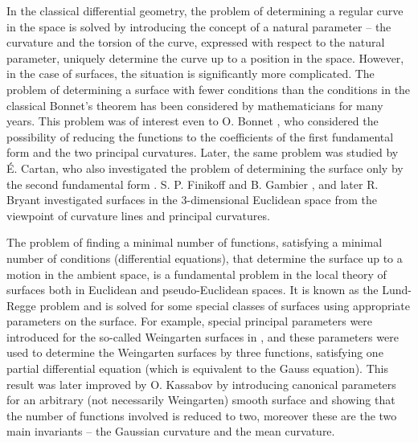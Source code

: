 \documentclass[12pt]{amsart}
\theoremstyle{definition}
\theoremstyle{remark}
\numberwithin{equation}{section}
\begin{document}
In the classical differential geometry, the problem of determining a regular curve in the space is solved by introducing the concept of a natural parameter -- the curvature and the torsion of the curve, expressed with respect to the natural parameter, uniquely determine the curve up to a position in the space. However, in the case of surfaces,  the situation is significantly more complicated. The problem of determining a surface with fewer conditions than the conditions in the classical Bonnet’s theorem has been considered by mathematicians for many years. This problem was of interest even to O. Bonnet \cite{Bon}, who considered the possibility of reducing the functions to the coefficients of the first fundamental form and the two principal curvatures. Later, the same problem was studied by \'E. Cartan, who also investigated the problem of determining the surface only by the second fundamental form \cite{Cartan-1}. S. P. Finikoff and B. Gambier \cite{Fin-Gam}, and later R. Bryant \cite{Bry} investigated surfaces in the 3-dimensional Euclidean space from the viewpoint of curvature lines and  principal curvatures. 

The problem of finding a minimal number of functions, satisfying a minimal number of conditions (differential equations), that determine the surface up to a motion in the ambient space, is a fundamental problem in the local theory of surfaces both in Euclidean and pseudo-Euclidean spaces. It is known as the Lund-Regge problem \cite{Lund-Reg} and  is solved for some special classes of surfaces using appropriate parameters on the surface. For example,  special principal parameters were introduced for the so-called Weingarten surfaces in \cite{Gan-Mih1}, and these parameters were used to determine the Weingarten surfaces by three functions, satisfying  one partial differential equation (which is equivalent to the Gauss equation). This result was later improved by O. Kassabov \cite{OK} by introducing canonical parameters for an arbitrary (not necessarily Weingarten) smooth surface and showing that the number of functions involved is reduced to two,  moreover these are the two main invariants -- the Gaussian curvature and the mean curvature.
\end{document}
